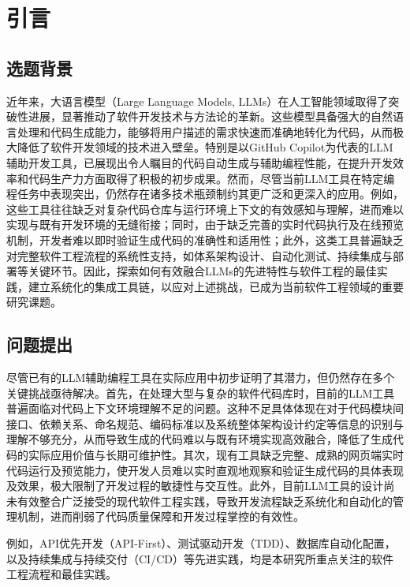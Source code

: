 
\chapter{引言}

\section{选题背景}

近年来，大语言模型（Large Language Models, LLMs）在人工智能领域取得了突破性进展，显著推动了软件开发技术与方法论的革新。这些模型具备强大的自然语言处理和代码生成能力，能够将用户描述的需求快速而准确地转化为代码，从而极大降低了软件开发领域的技术进入壁垒。特别是以GitHub Copilot为代表的LLM辅助开发工具，已展现出令人瞩目的代码自动生成与辅助编程性能，在提升开发效率和代码生产力方面取得了积极的初步成果。然而，尽管当前LLM工具在特定编程任务中表现突出，仍然存在诸多技术瓶颈制约其更广泛和更深入的应用。例如，这些工具往往缺乏对复杂代码仓库与运行环境上下文的有效感知与理解，进而难以实现与既有开发环境的无缝衔接；同时，由于缺乏完善的实时代码执行及在线预览机制，开发者难以即时验证生成代码的准确性和适用性；此外，这类工具普遍缺乏对完整软件工程流程的系统性支持，如体系架构设计、自动化测试、持续集成与部署等关键环节。因此，探索如何有效融合LLMs的先进特性与软件工程的最佳实践，建立系统化的集成工具链，以应对上述挑战，已成为当前软件工程领域的重要研究课题。

\section{问题提出}

尽管已有的LLM辅助编程工具在实际应用中初步证明了其潜力，但仍然存在多个关键挑战亟待解决。首先，在处理大型与复杂的软件代码库时，目前的LLM工具普遍面临对代码上下文环境理解不足的问题。这种不足具体体现在对于代码模块间接口、依赖关系、命名规范、编码标准以及系统整体架构设计约定等信息的识别与理解不够充分，从而导致生成的代码难以与既有环境实现高效融合，降低了生成代码的实际应用价值与长期可维护性。其次，现有工具缺乏完整、成熟的网页端实时代码运行及预览能力，使开发人员难以实时直观地观察和验证生成代码的具体表现及效果，极大限制了开发过程的敏捷性与交互性。此外，目前LLM工具的设计尚未有效整合广泛接受的现代软件工程实践，导致开发流程缺乏系统化和自动化的管理机制，进而削弱了代码质量保障和开发过程掌控的有效性。

例如，API优先开发（API-First）、测试驱动开发（TDD）、数据库自动化配置，以及持续集成与持续交付（CI/CD）等先进实践，均是本研究所重点关注的软件工程流程和最佳实践。

